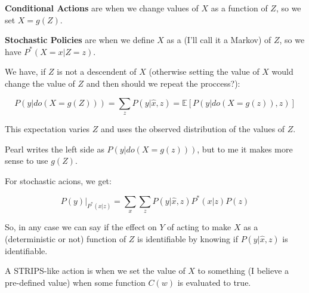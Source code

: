 \textbf{Conditional Actions} are when we change values of $X$ as a function of $Z$, so we set $X = g(Z)$.

\textbf{Stochastic Policies} are when we define $X$ as a  (I'll call it a Markov) of $Z$, so we have $P^*(X=x|Z=z)$.

We have, if $Z$ is not a descendent of $X$ (otherwise setting the value of $X$ would change the value of $Z$ and then should we repeat the proccess?):

$$P(y|do(X=g(Z))) = \sum\limits_z P(y|\hat{x},z) =  \mathbb{E}[P(y|do(X=g(z)),z)]$$

This expectation varies $Z$ and uses the observed distribution of the values of $Z$.

Pearl writes the left side as $P(y|do(X=g(z)))$, but to me it makes more sense to use $g(Z)$.

For stochastic acions, we get:

$$P(y)|_{P^*(x|z)} = \sum\limits_{x}\sum\limits_{z}P(y|\hat{x},z)P^*(x|z)P(z)$$

So, in any case we can say if the effect on $Y$ of acting to make $X$ as a (deterministic or not) function of $Z$ is identifiable by knowing if $P(y|\hat{x},z)$ is identifiable.

A STRIPS-like action is when we set the value of $X$ to something (I believe a pre-defined value) when some function $C(w)$ is evaluated to true.

